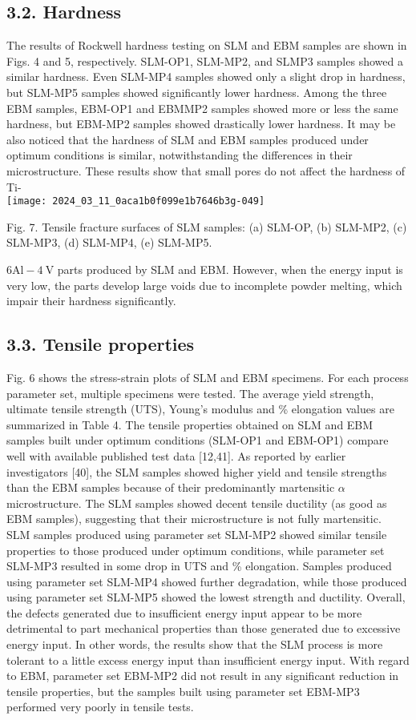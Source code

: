 \documentclass[10pt]{article}
\begin{document}
\subsection*{3.2. Hardness}
The results of Rockwell hardness testing on SLM and EBM samples are shown in Figs. 4 and 5, respectively. SLM-OP1, SLM-MP2, and SLMP3 samples showed a similar hardness. Even SLM-MP4 samples showed only a slight drop in hardness, but SLM-MP5 samples showed significantly lower hardness. Among the three EBM samples, EBM-OP1 and EBMMP2 samples showed more or less the same hardness, but EBM-MP2 samples showed drastically lower hardness. It may be also noticed that the hardness of SLM and EBM samples produced under optimum conditions is similar, notwithstanding the differences in their microstructure. These results show that small pores do not affect the hardness of Ti-\\
\texttt{[image: 2024\_03\_11\_0aca1b0f099e1b7646b3g-049]}

Fig. 7. Tensile fracture surfaces of SLM samples: (a) SLM-OP, (b) SLM-MP2, (c) SLM-MP3, (d) SLM-MP4, (e) SLM-MP5.

$6 \mathrm{Al}-4 \mathrm{~V}$ parts produced by SLM and EBM. However, when the energy input is very low, the parts develop large voids due to incomplete powder melting, which impair their hardness significantly.

\subsection*{3.3. Tensile properties}
Fig. 6 shows the stress-strain plots of SLM and EBM specimens. For each process parameter set, multiple specimens were tested. The average yield strength, ultimate tensile strength (UTS), Young's modulus and \% elongation values are summarized in Table 4. The tensile properties obtained on SLM and EBM samples built under optimum conditions (SLM-OP1 and EBM-OP1) compare well with available published test data [12,41]. As reported by earlier investigators [40], the SLM samples showed higher yield and tensile strengths than the EBM samples because of their predominantly martensitic $\alpha$ microstructure. The SLM samples showed decent tensile ductility (as good as EBM samples), suggesting that their microstructure is not fully martensitic.\\
SLM samples produced using parameter set SLM-MP2 showed similar tensile properties to those produced under optimum conditions, while parameter set SLM-MP3 resulted in some drop in UTS and \% elongation. Samples produced using parameter set SLM-MP4 showed further degradation, while those produced using parameter set SLM-MP5 showed the lowest strength and ductility. Overall, the defects generated due to insufficient energy input appear to be more detrimental to part mechanical properties than those generated due to excessive energy input. In other words, the results show that the SLM process is more tolerant to a little excess energy input than insufficient energy input. With regard to EBM, parameter set EBM-MP2 did not result in any significant reduction in tensile properties, but the samples built using parameter set EBM-MP3 performed very poorly in tensile tests.
\end{document}
